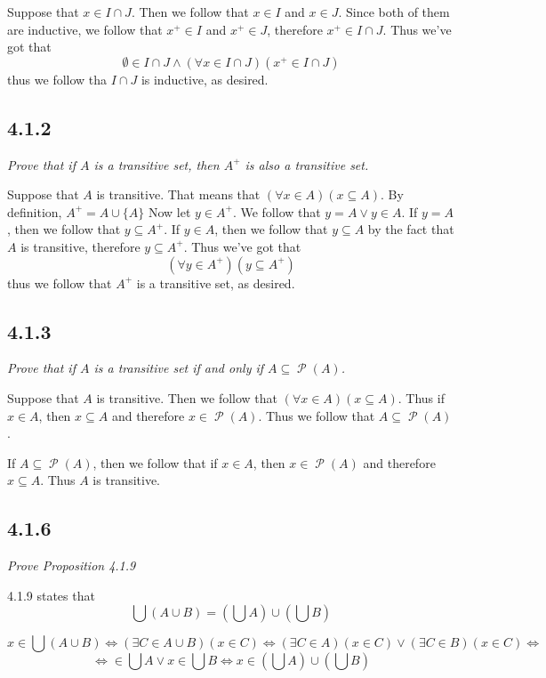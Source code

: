 \documentclass[11pt,oneside,titlepage]{book}
\DeclareMathOperator \pow {\mathcal {P}}
\DeclareMathOperator \lra {\Leftrightarrow}
\begin{document}
Suppose that $x \in I \cap J$. Then we follow that $x \in I$ and $x \in J$. Since both of them
are inductive, we follow that $x^+ \in I$ and $x^+ \in J$, therefore $x^+ \in I \cap J$. Thus
we've got that
$$\emptyset \in I \cap J \land (\forall x \in I \cap J)(x^+ \in I \cap J)$$
thus we follow tha $I \cap J$ is inductive, as desired.

\subsection*{4.1.2}

\textit{Prove that if $A$ is a transitive set, then $A^+$ is also a transitive set.}

Suppose that $A$ is transitive. That means that $(\forall x \in A)(x \subseteq A)$.
By definition, $A^+ = A \cup \{A\}$
Now let $y \in A^+$. We follow that $y = A \lor y \in A$. If $y = A$, then we follow that
$y \subseteq A^+$. If $y \in A$, then we follow that $y \subseteq A$ by the fact that
$A$ is transitive, therefore $y \subseteq A^+$. Thus we've got that
$$(\forall y \in A^+)(y \subseteq A^+)$$
thus we follow that $A^+$ is a transitive set, as desired.

\subsection*{4.1.3}

\textit{Prove that if $A$ is a transitive set if and only if $A \subseteq \pow(A)$.}

Suppose that $A$ is transitive. Then we follow that $(\forall x \in A)(x \subseteq A)$. Thus
if $x \in A$, then $x \subseteq A$ and therefore $x \in \pow(A)$. Thus we follow that
$A \subseteq \pow(A)$.

If $A \subseteq \pow(A)$, then we follow that if $x \in A$, then $x \in \pow(A)$ and therefore
$x \subseteq A$. Thus $A$ is transitive.


\subsection*{4.1.6}

\textit{Prove Proposition 4.1.9}

4.1.9 states that
$$\bigcup(A \cup B) = (\bigcup A) \cup (\bigcup B)$$

$$x \in \bigcup(A \cup B) \lra (\exists C \in A \cup B)(x \in C) \lra
(\exists C \in A)(x \in C) \lor (\exists C \in B)(x \in C) \lra$$
$$ \lra \in \bigcup A \lor x \in \bigcup B \lra x \in (\bigcup A) \cup (\bigcup B)$$
\end{document}
